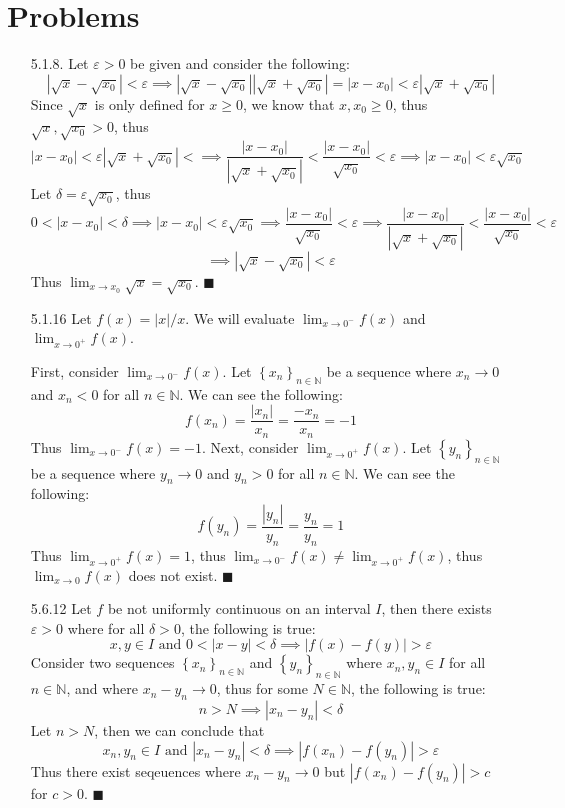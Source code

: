 \documentclass[11pt]{article}
\newcommand{\verts}[1]{\left\vert#1\right\vert}
\newcommand{\braces}[1]{\left\{#1\right\}}
\newcommand{\e}{\varepsilon}
\newcommand{\lm}[1]{\displaystyle\lim_{#1}}
\begin{document}
\pagestyle{fancy}
\fancyhead{}

\normalsize

\section*{Problems}
\begin{itemize}
    \item [5.1.8.] Let $\e>0$ be given and consider the following:
    \[\verts{\sqrt{x}-\sqrt{x_0}}<\e\implies\verts{\sqrt{x}-\sqrt{x_0}}\verts{\sqrt{x}+\sqrt{x_0}}=\verts{x-x_0}<\e\verts{\sqrt{x}+\sqrt{x_0}}\]
    Since $\sqrt{x}$ is only defined for $x\geq0$, we know that $x,x_0\geq0$, thus $\sqrt{x},\sqrt{x_0}>0$, thus
    \[\verts{x-x_0}<\e\verts{\sqrt{x}+\sqrt{x_0}}<\implies\frac{\verts{x-x_0}}{\verts{\sqrt{x}+\sqrt{x_0}}}<\frac{\verts{x-x_0}}{\sqrt{x_0}}<\e\implies\verts{x-x_0}<\e\sqrt{x_0}\]
    Let $\delta=\e\sqrt{x_0}$, thus
    \[0<\verts{x-x_0}<\delta\implies\verts{x-x_0}<\e\sqrt{x_0}\implies\frac{\verts{x-x_0}}{\sqrt{x_0}}<\e\implies\frac{\verts{x-x_0}}{\verts{\sqrt{x}+\sqrt{x_0}}}<\frac{\verts{x-x_0}}{\sqrt{x_0}}<\e\]
    \[\implies\verts{\sqrt{x}-\sqrt{x_0}}<\e\]
    Thus $\lm{x\to x_0}\sqrt{x}=\sqrt{x_0}$. $\blacksquare$

    \item [5.1.16] Let $f(x)=\verts{x}/x$. We will evaluate $\lm{x\to0^-}f(x)$ and $\lm{x\to0^+}f(x)$.

    First, consider $\lm{x\to0^-}f(x)$. Let $\braces{x_n}_{n\in\mathbb{N}}$ be a sequence where $x_n\to0$ and $x_n<0$ for all $n\in\mathbb{N}$. We can see the following:
    \[f(x_n)=\frac{\verts{x_n}}{x_n}=\frac{-x_n}{x_n}=-1\]
    Thus $\lm{x\to0^-}f(x)=-1$. Next, consider $\lm{x\to0^+}f(x)$. Let $\braces{y_n}_{n\in\mathbb{N}}$ be a sequence where $y_n\to0$ and $y_n>0$ for all $n\in\mathbb{N}$. We can see the following:
    \[f(y_n)=\frac{\verts{y_n}}{y_n}=\frac{y_n}{y_n}=1\]
    Thus $\lm{x\to0^+}f(x)=1$, thus $\lm{x\to0^-}f(x)\ne\lm{x\to0^+}f(x)$, thus $\lm{x\to0}f(x)$ does not exist. $\blacksquare$

    \item [5.6.12] Let $f$ be not uniformly continuous on an interval $I$, then there exists $\e>0$ where for all $\delta>0$, the following is true:
    \[x,y\in I\text{ and }0<\verts{x-y}<\delta\implies\verts{f(x)-f(y)}>\e\]
    Consider two sequences $\braces{x_n}_{n\in\mathbb{N}}$ and $\braces{y_n}_{n\in\mathbb{N}}$ where $x_n,y_n\in I$ for all $n\in\mathbb{N}$, and where $x_n-y_n\to0$, thus for some $N\in\mathbb{N}$, the following is true:
    \[n>N\implies\verts{x_n-y_n}<\delta\]
    Let $n>N$, then we can conclude that
    \[x_n,y_n\in I\text{ and }\verts{x_n-y_n}<\delta\implies\verts{f(x_n)-f(y_n)}>\e\]
    Thus there exist seqeuences where $x_n-y_n\to0$ but $\verts{f(x_n)-f(y_n)}>c$ for $c>0$. $\blacksquare$
\end{itemize}
\end{document}
